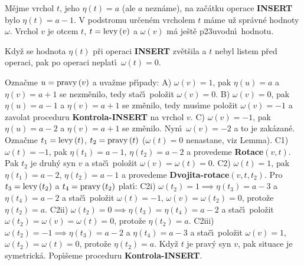 \flushpar M\v ejme vrchol $t$, jeho $\eta \left(t\right)=a$ (ale $a$ nezn\'ame), na 
za\v c\'atku 
ope\-ra\-ce {\bf INSERT} bylo $\eta \left(t\right)=a-1$.  V podstromu ur\v cen\'em 
vrcholem $t$ m\'ame u\v z spr\'avn\'e hodnoty $\omega$.  Vrchol $
v$ je otcem $t$, 
$t=\operatorname{levy}\left(v\right)$ a $\omega \left(v\right)$ m\'a je\v st\v e p\accent23uvodn\'\i\ hodnotu.  
\medskip

Kdy\v z se hodnota $\eta \left(t\right)$ p\v ri operaci {\bf INSERT }
zv\v et\v sila a $t$ nebyl listem p\v red operaci, pak po operaci 
neplat\'\i\ $\omega \left(t\right)=0$.
\endproclaim

\flushpar Ozna\v cme $u=\operatorname{pravy}\left(v\right)$ a uva\v zme p\v r\'\i pady:\newline 
A) $\omega \left(v\right)=1$, pak $\eta \left(u\right)=a$ a $\eta \left(v\right)=a+1$ se nezm\v enilo, 
tedy sta\v c\'\i\ polo\v zit $\omega \left(v\right)=0$.\newline 
B) $\omega \left(v\right)=0$, pak $\eta \left(u\right)=a-1$ a $\eta \left(v\right)=a+1$ se zm\v enilo, 
tedy mus\'\i me polo\v zit $\omega \left(v\right)=-1$ a zavolat proceduru 
{\bf Kontrola-INSERT} na vrchol $v$.\newline 
C) $\omega \left(v\right)=-1$, pak $\eta \left(u\right)=a-2$ a $\eta \left(v\right)=a+1$ se zm\v enilo. 
Nyn\'\i\ $\omega \left(v\right)=-2$ a to je zak\'azan\'e. Ozna\v cme $t_1=\operatorname{levy}
\left(t\right)$, 
$t_2=\operatorname{pravy}\left(t\right)$ ($\omega \left(t\right)=0$ nenastane, viz Lemma). 
\newline 
C1) $\omega \left(t\right)=-1$, pak $\eta \left(t_1\right)=a-1$, $\eta \left(t_2\right)=a-2$ a provedeme 
{\bf Rotace$\left(v,t\right)$}. Pak $t_2$ je druh\'y syn $v$ a sta\v c\'\i\ polo\v zit 
$\omega \left(v\right)=\omega \left(t\right)=0$.\newline 
C2) $\omega \left(t\right)=1$, pak $\eta \left(t_1\right)=a-2$, $\eta \left(t_2\right)=a-1$ a provedeme 
{\bf Dvojita-rotace$\left(v,t,t_2\right)$}. Pro $t_3=\operatorname{levy}\left(t_2\right)$ a $t_4=\operatorname{pravy}
\left(t_2\right)$ 
plat\'\i :\newline 
C2i) $\omega \left(t_2\right)=1\implies\eta \left(t_3\right)=a-3$ a $\eta \left(t_4\right)=a-2$ a sta\v c\'\i\ 
polo\v zit $\omega \left(t\right)=-1$, $\omega \left(v\right)=\omega \left(t_2\right)=0$, proto\v ze $
\eta \left(t_2\right)=a$.\newline 
C2ii) $\omega \left(t_2\right)=0\implies\eta \left(t_3\right)=\eta \left(t_4\right)=a-2$ a sta\v c\'\i\ polo\v zit 
$\omega \left(t_2\right)=\omega \left(v\right)=\omega \left(t\right)=0$, proto\v ze $\eta \left(t_2\right)=a$. \newline 
C2iii) $\omega \left(t_2\right)=-1\implies\eta \left(t_3\right)=a-2$ a $\eta \left(t_4\right)=a-3$ a 
sta\v c\'\i\ polo\v zit $\omega \left(v\right)=1$, $\omega \left(t_2\right)=\omega \left(t\right)=
0$, proto\v ze $\eta \left(t_2\right)=a$.\newline 
Kdy\v z $t$ je prav\'y syn $v$, pak situace je symetrick\'a.\newline 
Pop\'\i\v seme proceduru {\bf Kontrola-INSERT}.
\medskip

